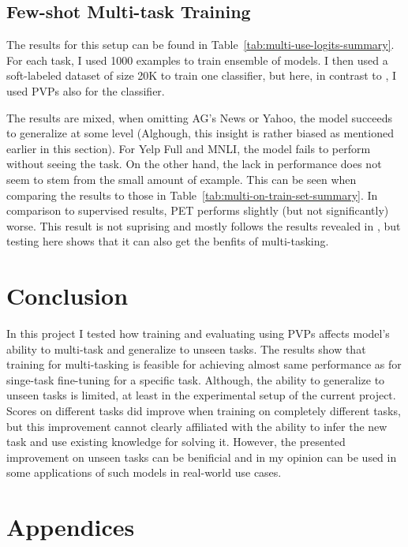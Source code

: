 \documentclass[11pt,a4paper]{article}
\begin{document}
\vspace{8pt}

\subsection*{Few-shot Multi-task Training}
The results for this setup can be found in Table~\ref{tab:multi-use-logits-summary}.
For each task, I used 1000 examples to train ensemble of models.
I then used a soft-labeled dataset of size 20K to train one classifier, but here, in contrast to \citet{schick2020exploiting}, I used PVPs also for the classifier.

The results are mixed, when omitting AG's News or Yahoo, the model succeeds to generalize at some level (Alghough, this insight is rather biased as mentioned earlier in this section).
For Yelp Full and MNLI, the model fails to perform without seeing the task.
On the other hand, the lack in performance does not seem to stem from the small amount of example.
This can be seen when comparing the results to those in Table~\ref{tab:multi-on-train-set-summary}.
In comparison to supervised results, PET performs slightly (but not significantly) worse.
This result is not suprising and mostly follows the results revealed in \citet{schick2020exploiting}, but testing here shows that it can also get the benfits of multi-tasking.

\section{Conclusion}
In this project I tested how training and evaluating using PVPs affects model's ability to multi-task and generalize to unseen tasks.
The results show that training for multi-tasking is feasible for achieving almost same performance as for singe-task fine-tuning for a specific task.
Although, the ability to generalize to unseen tasks is limited, at least in the experimental setup of the current project.
Scores on different tasks did improve when training on completely different tasks, but this improvement cannot clearly affiliated with the ability to infer the new task and use existing knowledge for solving it. 
However, the presented improvement on unseen tasks can be benificial and in my opinion can be used in some applications of such models in real-world use cases. 




\clearpage
\appendix


\section{Appendices}
\label{sec:appendix}
\end{document}
